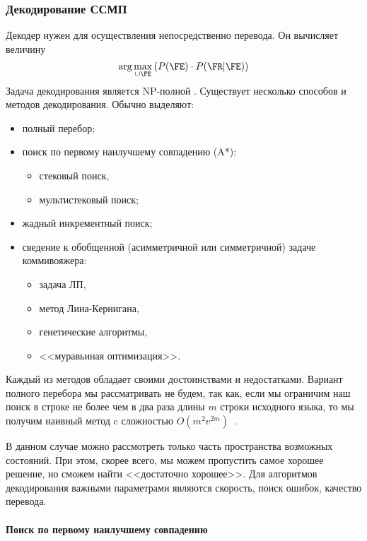 
\subsubsection{Декодирование ССМП}

Декодер нужен для осуществления непосредственно перевода.
Он вычисляет величину
\[
	\arg\max\limits_{\cup \FE} \left(  P(\FE) \cdot P(\FR|\FE) \right)
\]
Задача декодирования является NP-полной \cite{Knight:1999}.
Существует несколько способов и методов декодирования.
Обычно выделяют:
\begin{itemize}
	\item полный перебор;
	\item поиск по первому наилучшему совпадению (A*):
	\begin{itemize}
		\item стековый поиск,
		\item мультистековый поиск;
	\end{itemize}
	\item жадный инкрементный поиск;
	\item сведение к обобщенной (асимметричной или симметричной) задаче коммивояжера:
	\begin{itemize}
		\item задача ЛП,
		\item метод Лина-Кернигана,
		\item генетические алгоритмы,
		\item {<<муравьиная оптимизация>>}.
	\end{itemize}
\end{itemize}
Каждый из методов обладает своими достоинствами и недостатками.
Вариант полного перебора мы рассматривать не будем, так как,
если мы ограничим наш поиск в строке не более чем 
в два раза длины $m$ строки исходного языка, 
то мы получим наивный метод c сложностью $O(m^2 v^{2m})$~\cite{Knight:1999}.

В данном случае можно рассмотреть только часть пространства возможных состояний.
При этом, скорее всего, мы можем пропустить самое хорошее решение, но сможем найти <<достаточно хорошее>>.
Для алгоритмов декодирования важными параметрами являются скорость, поиск ошибок, качество перевода.

\paragraph{Поиск по первому наилучшему совпадению}

